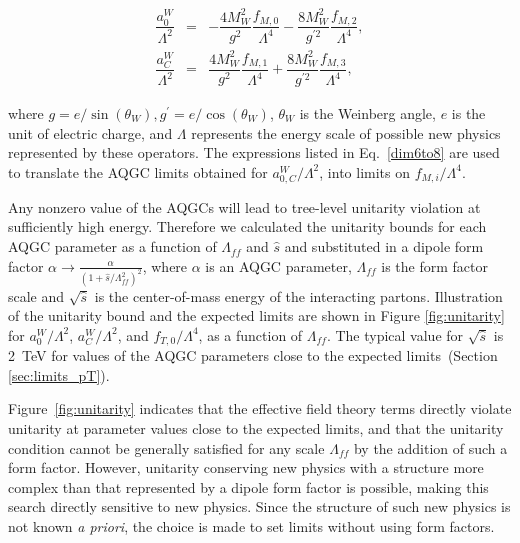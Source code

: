 \begin{center}
\begin{eqnarray}
\dfrac{a_0^W}{\Lambda^2} &= &-\dfrac{4 M_W^2}{g^2} \dfrac{f_{M,0}}{\Lambda^{ 4}} - \dfrac{8 M_W^2}{g^{' 2}} \dfrac{f_{M,2}}{\Lambda^{ 4}}, \nonumber \\ 
\dfrac{a_C^W}{\Lambda^2} &= &\dfrac{4 M_W^2}{g^2} \dfrac{f_{M,1}}{\Lambda^{ 4}} + \dfrac{8 M_W^2}{g^{' 2}} \dfrac{f_{M,3}}{\Lambda^{ 4}},
\label{dim6to8}
\end{eqnarray}
\end{center}
where $g = e/\sin(\theta_W), g^{'} = e/\cos(\theta_W)$, $\theta_W$ is
the Weinberg angle, $e$ is the unit of electric charge, and $\Lambda$
represents the energy scale of possible new physics represented by these operators. 
The expressions listed in Eq.~\eqref{dim6to8} are used to translate 
the AQGC limits obtained for $a_{0,C}^W/\Lambda^2$, into limits on $f_{M,i}/\Lambda^4$.


Any nonzero value of the AQGCs will lead to tree-level unitarity
violation at sufficiently high energy. Therefore we calculated the
unitarity bounds \cite{Chapon:2009,AQGC:2001} for each AQGC parameter
as a function of $\Lambda_{ff}$ and $\hat{s}$ and substituted in a
dipole form factor $\alpha\rightarrow\frac{\alpha}{(1 +
\hat{s}/\Lambda_{ff}^2)^2}$, where $\alpha$ is an AQGC parameter,
$\Lambda_{ff}$ is the form factor scale and $\sqrt{\hat{s}}$ is the
center-of-mass energy of the interacting partons.  Illustration of the
unitarity bound and the expected limits are shown in Figure
\ref{fig:unitarity} for $a_{0}^{W}/\Lambda^{2}$,
$a_{C}^{W}/\Lambda^{2}$, and $f_{T,0}/\Lambda^{4}$, as a function of
$\Lambda_{ff}$.  The typical value for $\sqrt{\hat{s}}$ is 2~TeV for
values of the AQGC parameters close to the expected
limits~(Section \ref{sec:limits_pT}).

Figure~\ref{fig:unitarity} indicates that the effective field theory
terms directly violate unitarity at parameter values close to the
expected limits, and that the unitarity condition cannot be generally
satisfied for any scale $\Lambda_{ff}$ by the addition of such a form
factor. However, unitarity conserving new physics with a structure
more complex than that represented by a dipole form factor is
possible, making this search directly sensitive to new physics.  Since
the structure of such new physics is not known \textit{a priori}, the
choice is made to set limits without using form factors.  


